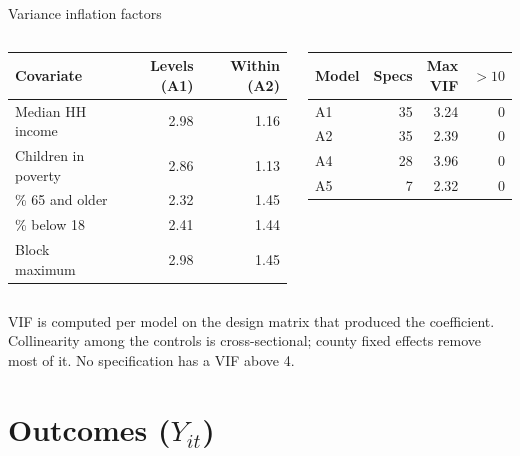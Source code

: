 \documentclass[aspectratio=169]{beamer}
\begin{document}
\begin{frame}{Variance inflation factors}
\begin{columns}[T,onlytextwidth]
\begin{center}\scriptsize
\begin{tabular}{@{}lrr@{}}
\toprule
Covariate & Levels (A1) & Within (A2) \\
\midrule
Median HH income & 2.98 & 1.16 \\
Children in poverty & 2.86 & 1.13 \\
\% 65 and older & 2.32 & 1.45 \\
\% below 18 & 2.41 & 1.44 \\
\midrule
Block maximum & 2.98 & 1.45 \\
\bottomrule
\end{tabular}
\end{center}
\begin{center}\scriptsize
\begin{tabular}{@{}lrrr@{}}
\toprule
Model & Specs & Max VIF & $>10$ \\
\midrule
A1 & 35 & 3.24 & 0 \\
A2 & 35 & 2.39 & 0 \\
A4 & 28 & 3.96 & 0 \\
A5 & 7 & 2.32 & 0 \\
\bottomrule
\end{tabular}
\end{center}
\end{columns}
\vspace{0.5em}
{\footnotesize VIF is computed per model on the design matrix that produced the coefficient. Collinearity among the controls is cross-sectional; county fixed effects remove most of it. No specification has a VIF above 4.}
\end{frame}

\section{Outcomes ($Y_{it}$)}
\end{document}

